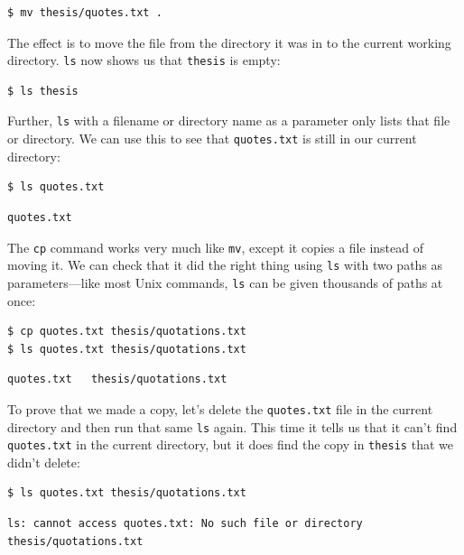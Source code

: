 \documentclass[]{book}
\begin{document}
\begin{verbatim}
$ mv thesis/quotes.txt .
\end{verbatim}

The effect is to move the file from the directory it was in to the
current working directory. \texttt{ls} now shows us that \texttt{thesis}
is empty:

\begin{verbatim}
$ ls thesis
\end{verbatim}

Further, \texttt{ls} with a filename or directory name as a parameter
only lists that file or directory. We can use this to see that
\texttt{quotes.txt} is still in our current directory:

\begin{verbatim}
$ ls quotes.txt
\end{verbatim}

\begin{verbatim}
quotes.txt
\end{verbatim}

The \texttt{cp} command works very much like \texttt{mv}, except it
copies a file instead of moving it. We can check that it did the right
thing using \texttt{ls} with two paths as parameters---like most Unix
commands, \texttt{ls} can be given thousands of paths at once:

\begin{verbatim}
$ cp quotes.txt thesis/quotations.txt
$ ls quotes.txt thesis/quotations.txt
\end{verbatim}

\begin{verbatim}
quotes.txt   thesis/quotations.txt
\end{verbatim}

To prove that we made a copy, let's delete the \texttt{quotes.txt} file
in the current directory and then run that same \texttt{ls} again. This
time it tells us that it can't find \texttt{quotes.txt} in the current
directory, but it does find the copy in \texttt{thesis} that we didn't
delete:

\begin{verbatim}
$ ls quotes.txt thesis/quotations.txt
\end{verbatim}

\begin{verbatim}
ls: cannot access quotes.txt: No such file or directory
thesis/quotations.txt
\end{verbatim}
\end{document}
